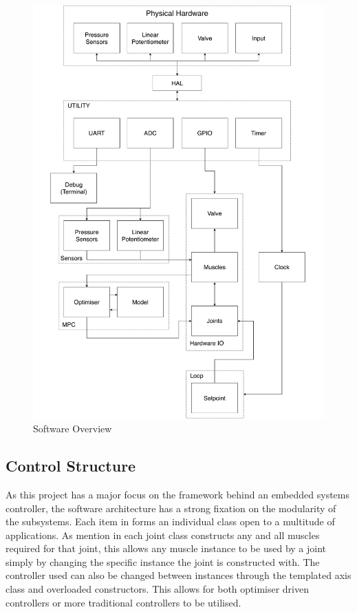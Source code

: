 \documentclass[11pt,a4paper]{article}
\begin{document}
\begin{figure}[!hbt]
    \centering
    \includegraphics[clip, trim=0cm 0cm 0cm 0cm, width=1.00\textwidth]{Software.pdf}
    \caption{Software Overview}
    \label{fig:software_arch}
\end{figure}

\subsection{Control Structure}
\label{sub:control_structure}
As this project has a major focus on the framework behind an embedded systems controller, the software architecture has a strong fixation on the modularity of the subsystems. Each item in  forms an individual class open to a multitude of applications. As mention in  each joint class constructs any and all muscles required for that joint, this allows any muscle instance to be used by a joint simply by changing the specific instance the joint is constructed with. The controller used can also be changed between instances through the templated axis class and overloaded constructors. This allows for both optimiser driven controllers or more traditional controllers to be utilised. 
\end{document}
